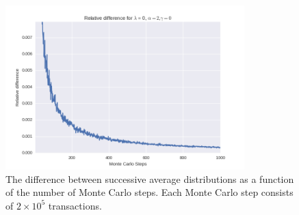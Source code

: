 \documentclass[a4paper, 10pt]{article}
\begin{document}
\begin{figure}[!ht]
\centering
\includegraphics[height=2.5in]{relDiffL0A2G0.png} %
\caption{The difference between successive average distributions as a function of the number of Monte Carlo steps. Each Monte Carlo step consists of $2\times 10^5$ transactions.}\label{fig:ModelC_MC_Steps}
\end{figure}
\end{document}
